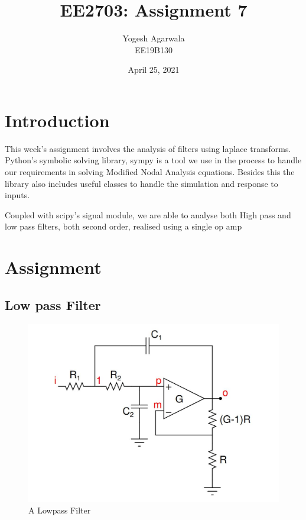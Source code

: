 \documentclass{article}
\title{EE2703: Assignment 7}
\author{Yogesh Agarwala \\ EE19B130}
\date{April 25, 2021}
\begin{document}
\maketitle

\section{Introduction}
This week's assignment involves the analysis of filters using laplace transforms. Python's symbolic solving library, sympy is a tool we use in the process to handle our requirements in solving Modified Nodal Analysis  equations. Besides this the library also includes useful classes to handle the simulation and response to inputs.

Coupled with scipy's signal module, we are able to analyse both High pass and low pass filters, both second order, realised using a single op amp



\section{Assignment}
\subsection{Low pass Filter}
\begin{figure}[h!]
	\centering
	\includegraphics[scale=0.4]{lowpass.jpg}
	\caption{A Lowpass Filter}
	\label{fig:A Lowpass Filter}
\end{figure}

\clearpage
\end{document}
